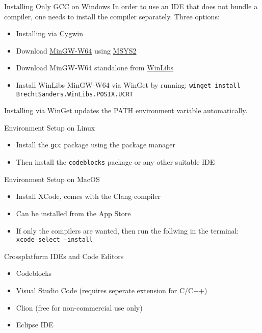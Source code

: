 \documentclass[12pt, aspectratio=169]{beamer}
\begin{document}
    \begin{frame}{Installing Only GCC on Windows}
        In order to use an IDE that does not bundle a compiler, one needs to install the compiler separately. Three options:
        \begin{itemize}
            \item Installing via \href{https://www.cygwin.com/}{Cygwin}
            \item Download \href{https://www.mingw-w64.org/}{MinGW-W64} using \href{https://www.msys2.org/}{MSYS2}
            \item Download MinGW-W64 standalone from \href{https://winlibs.com/}{WinLibs}
            \item Install WinLibs MinGW-W64 via WinGet by running: \texttt{winget~install BrechtSanders.WinLibs.POSIX.UCRT}
        \end{itemize}

        Installing via WinGet updates the PATH environment variable automatically.
    \end{frame}

    \begin{frame}{Environment Setup on Linux}
        \begin{itemize}
            \item Install the \texttt{gcc} package using the package manager
            \item Then install the \texttt{codeblocks} package or any other suitable IDE
        \end{itemize}
    \end{frame}

    \begin{frame}{Environment Setup on MacOS}
        \begin{itemize}
            \item Install XCode, comes with the Clang compiler
            \item Can be installed from the App Store
            \item If only the compilers are wanted, then run the follwing in the terminal: \texttt{xcode-select~--install}
        \end{itemize}
    \end{frame}

    \begin{frame}{Crossplatform IDEs and Code Editors}
        \begin{itemize}
            \item Codeblocks
            \item Visual Studio Code (requires seperate extension for C/C++)
            \item Clion (free for non-commercial use only)
            \item Eclipse IDE
        \end{itemize}
    \end{frame}
\end{document}
